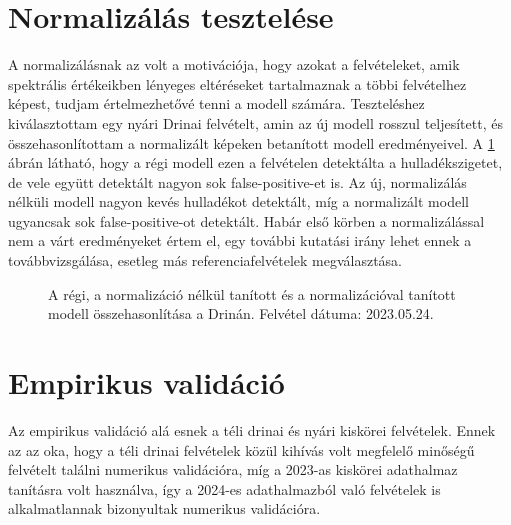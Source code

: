 \section{Normalizálás tesztelése}
\label{ch:normalization-test} 

A normalizálásnak az volt a motivációja, hogy azokat a felvételeket, amik spektrális értékeikben lényeges eltéréseket tartalmaznak a többi felvételhez képest, tudjam értelmezhetővé tenni a modell számára. Teszteléshez kiválasztottam egy nyári Drinai felvételt, amin az új modell rosszul teljesített, és összehasonlítottam a normalizált képeken betanított modell eredményeivel. A \ref{fig:normal-vs-normalized-vs-old} ábrán látható, hogy a régi modell ezen a felvételen detektálta a hulladékszigetet, de vele együtt detektált nagyon sok false-positive-et is. Az új, normalizálás nélküli modell nagyon kevés hulladékot detektált, míg a normalizált modell ugyancsak sok false-positive-ot detektált. Habár első körben a normalizálással nem a várt eredményeket értem el, egy további kutatási irány lehet ennek a továbbvizsgálása, esetleg más referenciafelvételek megválasztása.

\begin{figure}[H]
	\centering
	\hspace{5pt}
	\hspace{5pt}
	\caption{A régi, a normalizáció nélkül tanított és a normalizációval tanított modell összehasonlítása a Drinán. Felvétel dátuma: 2023.05.24.}
	\label{fig:normal-vs-normalized-vs-old}
\end{figure}


\section{Empirikus validáció}
\label{ch:empirical-validation}
Az empirikus validáció alá esnek a téli drinai és nyári kiskörei felvételek. Ennek az az oka, hogy a téli drinai felvételek közül kihívás volt megfelelő minőségű felvételt találni numerikus validációra, míg a 2023-as kiskörei adathalmaz tanításra volt használva, így a 2024-es adathalmazból való felvételek is alkalmatlannak bizonyultak numerikus validációra. 


